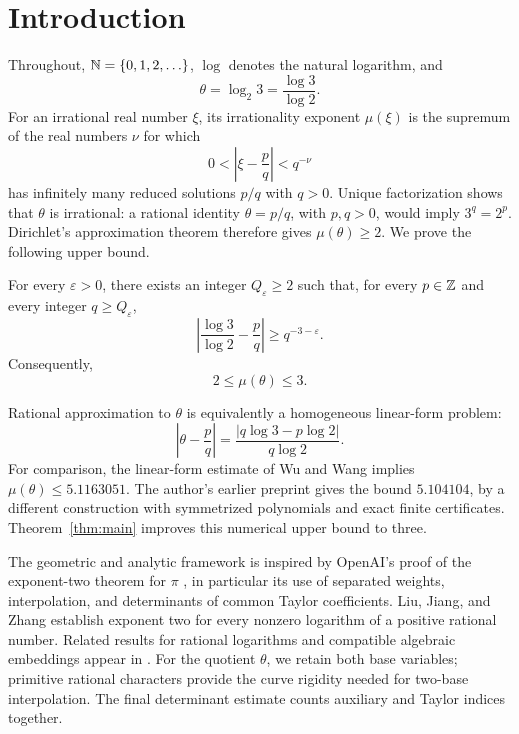\section{Introduction}

Throughout, \(\mathbb N=\{0,1,2,\ldots\}\), \(\log\) denotes the natural
logarithm, and
\[
                         \theta=\log_2 3=\frac{\log 3}{\log 2}.
\]
For an irrational real number \(\xi\), its irrationality exponent
\(\mu(\xi)\) is the supremum of the real numbers \(\nu\) for which
\[
                 0<\left|\xi-\frac pq\right|<q^{-\nu}
\]
has infinitely many reduced solutions \(p/q\) with \(q>0\).
Unique factorization shows that \(\theta\) is irrational: a rational
identity \(\theta=p/q\), with \(p,q>0\), would imply \(3^q=2^p\).
Dirichlet's approximation theorem therefore gives \(\mu(\theta)\geq2\).
We prove the following upper bound.

\begin{theorem}\label{thm:main}
For every \(\varepsilon>0\), there exists an integer
\(Q_\varepsilon\geq2\) such that, for every \(p\in\mathbb Z\) and every
integer \(q\geq Q_\varepsilon\),
\begin{equation}\label{eq:main}
 \left|\frac{\log 3}{\log 2}-\frac pq\right|
                       \geq q^{-3-\varepsilon}.
\end{equation}
Consequently,
\[
                         2\leq\mu(\theta)\leq3.
\]
\end{theorem}

Rational approximation to \(\theta\) is equivalently a homogeneous
linear-form problem:
\[
 \left|\theta-\frac pq\right|
       =\frac{|q\log 3-p\log 2|}{q\log 2}.
\]
For comparison, the linear-form estimate of Wu and Wang
\cite{WuWang2014} implies \(\mu(\theta)\leq5.1163051\).
The author's earlier preprint \cite{JhaEarlier} gives the bound
\(5.104104\), by a different construction with symmetrized
polynomials and exact finite certificates. Theorem~\ref{thm:main}
improves this numerical upper bound to three.

The geometric and analytic framework is inspired by OpenAI's proof
of the exponent-two theorem for \(\pi\) \cite{OAIpi}, in particular
its use of separated weights, interpolation, and determinants of
common Taylor coefficients. Liu, Jiang, and Zhang \cite{LJZ2026}
establish exponent two for every nonzero logarithm of a positive
rational number. Related results for rational logarithms and
compatible algebraic embeddings appear in \cite{JhaLogarithms}.
For the quotient \(\theta\), we retain both base variables; primitive rational
characters provide the curve rigidity needed for two-base interpolation.
The final determinant estimate counts auxiliary and Taylor indices
together.

